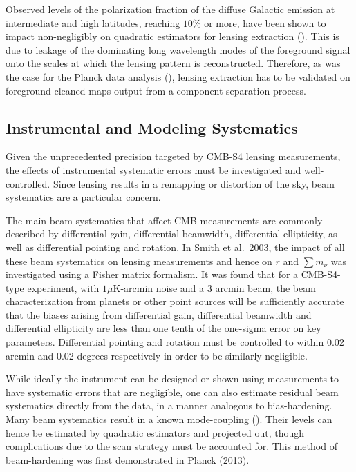 Observed levels of the polarization fraction of the diffuse Galactic emission at intermediate and high latitudes, reaching $10\%$ or more, 
have been shown to impact non-negligibly on quadratic estimators for lensing extraction (\cite{Fantaye:2012ha}). 
This is due to leakage of the dominating long wavelength modes of the foreground signal onto the scales at which the lensing pattern is reconstructed. 
Therefore, as was the case for the Planck data analysis (\cite{Ade:2015zua}), lensing extraction has to be validated on foreground cleaned maps output from a component separation process. 

\subsection{Instrumental and Modeling Systematics}\label{systInst}
 	
Given the unprecedented precision targeted by CMB-S4 lensing measurements, the effects of instrumental systematic errors must be investigated and well-controlled. Since lensing results in a remapping or distortion of the sky, beam systematics are a particular concern. 

The main beam systematics that affect CMB measurements are commonly described by differential gain, differential beamwidth, differential ellipticity, as well as differential pointing and rotation. In Smith et al.~2003, the impact of all these beam systematics on lensing measurements and hence on $r$ and $\sum m_\nu$ was investigated using a Fisher matrix formalism. It was found that for a CMB-S4-type experiment, with $1 \mu $K-arcmin noise and a 3 arcmin beam, the beam characterization from planets or other point sources will be sufficiently accurate that the biases arising from differential gain, differential beamwidth and differential ellipticity are less than one tenth of the one-sigma error on key parameters. Differential pointing and rotation must be controlled to within 0.02 arcmin and 0.02 degrees respectively in order to be similarly negligible.

While ideally the instrument can be designed or shown using measurements to have systematic errors that are negligible, one can also estimate residual beam systematics directly from the data, in a manner analogous to bias-hardening. Many beam systematics result in a known mode-coupling (\cite{Yadav:2009eb}).  Their levels can hence be estimated by quadratic estimators and projected out, though complications due to the scan strategy must be accounted for. This method of beam-hardening was first demonstrated in Planck (2013).

